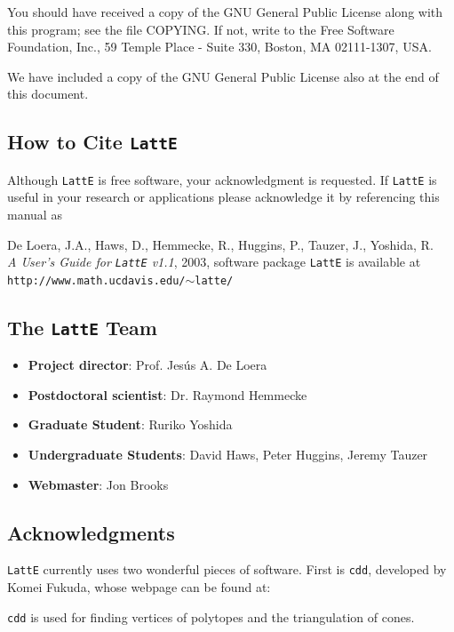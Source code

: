 \documentclass{article}
\begin{document}
You should have received a copy of the GNU General Public License
along with this program; see the file COPYING. If not, write to
the Free Software Foundation, Inc., 59 Temple Place - Suite 330,
Boston, MA 02111-1307, USA.

We have included a copy of the GNU General Public License also at the
end of this document.

\subsection{How to Cite {\tt LattE}}

Although {\tt LattE} is free software, your acknowledgment
is requested.  If {\tt LattE} is useful in your research or
applications please acknowledge it by referencing this manual as

De Loera, J.A., Haws, D., Hemmecke, R., Huggins, P.,
Tauzer, J., Yoshida, R.\\ 
{\em A User's Guide for {\tt LattE} v1.1}, 2003, 
software package {\tt LattE} is available at 
{\tt http://www.math.ucdavis.edu/$\sim$latte/}
	
\subsection{The {\tt LattE} Team}
\begin{itemize}
\item \textbf{Project director}:  Prof. Jes\'us A. De Loera 	
\item \textbf{Postdoctoral scientist}:  Dr. Raymond Hemmecke	
\item \textbf{Graduate Student}:  Ruriko Yoshida
\item \textbf{Undergraduate Students}:  David Haws, Peter Huggins, 
  Jeremy Tauzer 
\item \textbf{Webmaster}:  Jon Brooks
\end{itemize}

\subsection{Acknowledgments}

\par {\tt LattE} currently uses two wonderful pieces of software.
First is {\tt cdd}, developed by Komei Fukuda, whose webpage can be
found at:


{\tt cdd} is used for finding vertices of polytopes and the
triangulation of cones.
\end{document}

